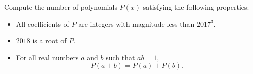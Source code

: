 Compute the number of polynomials $P(x)$ satisfying the following properties:
\begin{itemize}
    \item All coefficients of $P$ are integers with magnitude less than $2017^3$.
    \item $2018$ is a root of $P$.
    \item For all real numbers $a$ and $b$ such that $ab=1$,
    \[
    	P(a+b)=P(a)+P(b).
	\]
\end{itemize}